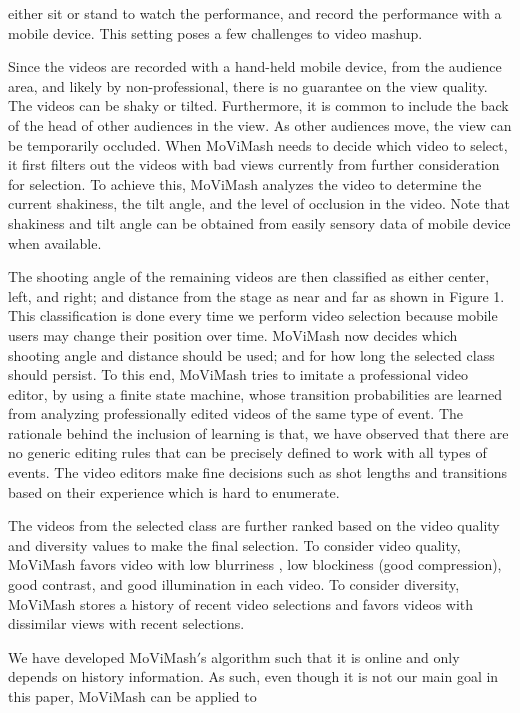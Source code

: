 \documentclass{sig-alternate-05-2015}
\begin{document}
either sit or stand to watch the performance, and record the performance
with a mobile device. This setting poses a few challenges to
video mashup.\par
Since the videos are recorded with a hand-held mobile device,
from the audience area, and likely by non-professional, there is no
guarantee on the view quality. The videos can be shaky or tilted.
Furthermore, it is common to include the back of the head of other
audiences in the view. As other audiences move, the view can be
temporarily occluded. When MoViMash needs to decide which
video to select, it first filters out the videos with bad views currently
from further consideration for selection. To achieve this, MoViMash
analyzes the video to determine the current shakiness, the tilt
angle, and the level of occlusion in the video. Note that shakiness
and tilt angle can be obtained from easily sensory data of mobile
device when available.\par
The shooting angle of the remaining videos are then classified as
either center, left, and right; and distance from the stage as near and
far as shown in Figure 1. This classification is done every time we
perform video selection because mobile users may change their position
over time. MoViMash now decides which shooting angle and
distance should be used; and for how long the selected class should
persist. To this end, MoViMash tries to imitate a professional video
editor, by using a finite state machine, whose transition probabilities
are learned from analyzing professionally edited videos of the
same type of event. The rationale behind the inclusion of learning
is that, we have observed that there are no generic editing rules
that can be precisely defined to work with all types of events. The
video editors make fine decisions such as shot lengths and transitions
based on their experience which is hard to enumerate.\par
The videos from the selected class are further ranked based on
the video quality and diversity values to make the final selection.
To consider video quality, MoViMash favors video with low blurriness
, low blockiness (good compression), good contrast, and good
illumination in each video. To consider diversity, MoViMash stores
a history of recent video selections and favors videos with dissimilar
views with recent selections.\par
We have developed MoViMash$'$s algorithm such that it is online
and only depends on history information. As such, even though
it is not our main goal in this paper, MoViMash can be applied to
\end{document}
